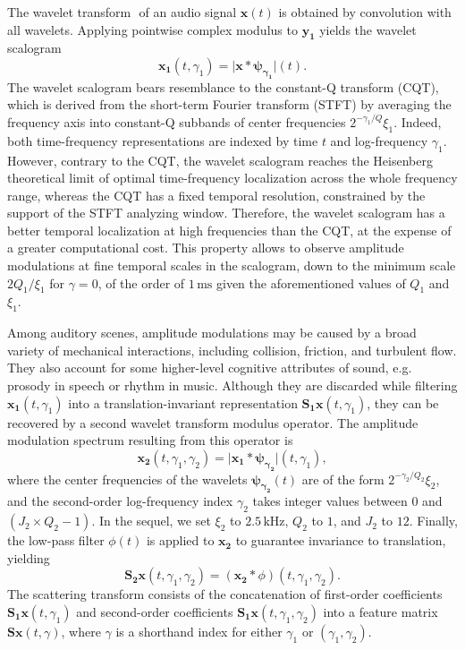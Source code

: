 \documentclass[journal]{IEEEtran}
\makeatletter
\newcommand*{\eg}{e.g.\@\xspace}
\makeatother
\begin{document}
The wavelet transform $\boldsymbol{}$ of an audio signal
$\boldsymbol{x}(t)$ is obtained by convolution with all wavelets.
Applying pointwise complex modulus to $\boldsymbol{y_1}$ yields
the wavelet scalogram
\begin{equation}
\boldsymbol{x_1}(t, \gamma_1)
= \vert \boldsymbol{x} \ast \boldsymbol{\psi_{\gamma_1}} \vert (t).
\end{equation}
The wavelet scalogram bears resemblance to the constant-Q transform (CQT),
which is derived from the short-term Fourier transform (STFT) by averaging the frequency
axis into constant-Q subbands of center frequencies $2^{-\gamma_1/Q}\xi_1$.
Indeed, both time-frequency representations are indexed by time $t$ and log-frequency $\gamma_1$.
However, contrary to the CQT, the wavelet scalogram reaches the Heisenberg
theoretical limit of optimal time-frequency localization across the whole
frequency range, whereas the CQT has a fixed temporal resolution, constrained by the support of the STFT analyzing window.
Therefore, the wavelet scalogram has a better temporal localization at high
frequencies than the CQT, at the expense of a greater computational cost.
This property allows to observe amplitude modulations at fine temporal scales in the scalogram, down to the minimum scale $2Q_1/\xi_1$ for $\gamma = 0$, of the order of $1\,\textrm{ms}$ given the aforementioned values of $Q_1$ and $\xi_1$.

Among auditory scenes, amplitude modulations may be caused by a broad variety of mechanical interactions, including collision, friction, and turbulent flow.
They also account for some higher-level cognitive attributes of sound, \eg prosody in speech or rhythm in music.
Although they are discarded while filtering $\boldsymbol{x_1}(t,\gamma_1)$ into a translation-invariant representation $\mathbf{S_1}\boldsymbol{x}(t,\gamma_1)$, they can be recovered by a second wavelet transform modulus operator.
The amplitude modulation spectrum resulting from this operator is
\begin{equation}
\boldsymbol{x_2}(t,\gamma_1,\gamma_2) =
\vert \boldsymbol{x_1} \ast \boldsymbol{\psi_{\gamma_2}} \vert(t,\gamma_1),
\end{equation}
where the center frequencies of the wavelets $\boldsymbol{\psi_{\gamma_2}}(t)$ are of the form $2^{-\gamma_2/Q_2} \xi_2$, and the second-order log-frequency index $\gamma_2$ takes integer values between $0$ and $(J_2 \times Q_2 - 1)$.
In the sequel, we set $\xi_2$ to $2.5\,\mathrm{kHz}$, $Q_2$ to $1$, and $J_2$ to $12$. Finally, the low-pass filter $\phi(t)$ is applied to $\boldsymbol{x_2}$ to guarantee invariance to translation, yielding
\begin{equation}
\mathbf{S_2}\boldsymbol{x}(t,\gamma_1,\gamma_2) =
(\boldsymbol{x_2} \ast \phi)(t,\gamma_1,\gamma_2).
\end{equation}
The scattering transform consists of the concatenation of first-order coefficients $\mathbf{S_1}\boldsymbol{x}(t,\gamma_1)$ and second-order coefficients $\mathbf{S_1}\boldsymbol{x}(t,\gamma_1,\gamma_2)$ into a feature matrix $\mathbf{S}\boldsymbol{x}(t,\gamma)$, where $\gamma$ is a shorthand index for either $\gamma_1$ or $(\gamma_1,\gamma_2)$.
\end{document}
